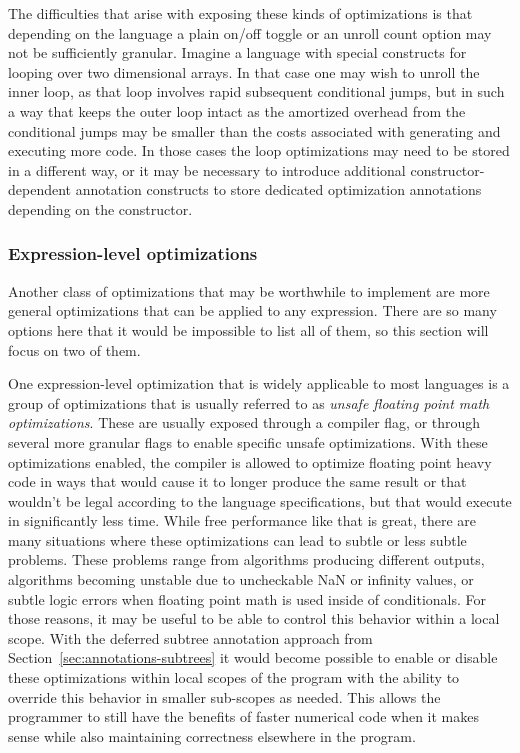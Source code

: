 \documentclass[fontsize=11pt,a4paper,parskip=half,numbers=noenddot]{scrartcl}
\begin{document}
The difficulties that arise with exposing these kinds of optimizations is that
depending on the language a plain on/off toggle or an unroll count option may
not be sufficiently granular. Imagine a language with special constructs for
looping over two dimensional arrays. In that case one may wish to unroll the
inner loop, as that loop involves rapid subsequent conditional jumps, but in
such a way that keeps the outer loop intact as the amortized overhead from the
conditional jumps may be smaller than the costs associated with generating and
executing more code. In those cases the loop optimizations may need to be stored
in a different way, or it may be necessary to introduce additional
constructor-dependent annotation constructs to store dedicated optimization
annotations depending on the constructor.

\subsubsection{Expression-level optimizations}


Another class of optimizations that may be worthwhile to implement are more
general optimizations that can be applied to any expression. There are so many
options here that it would be impossible to list all of them, so this section
will focus on two of them.

One expression-level optimization that is widely applicable to most languages is
a group of optimizations that is usually referred to as \emph{unsafe floating
  point math optimizations}. These are usually exposed through a
 compiler flag, or through several more granular flags to
enable specific unsafe optimizations. With these optimizations enabled, the
compiler is allowed to optimize floating point heavy code in ways that would
cause it to longer produce the same result or that wouldn't be legal according
to the language specifications, but that would execute in significantly less
time. While free performance like that is great, there are many situations where
these optimizations can lead to subtle or less subtle problems. These problems
range from algorithms producing different outputs, algorithms becoming unstable
due to uncheckable NaN or infinity values, or subtle logic errors when floating
point math is used inside of conditionals. For those reasons, it may be useful
to be able to control this behavior within a local scope. With the deferred
subtree annotation approach from Section~\ref{sec:annotations-subtrees} it would
become possible to enable or disable these optimizations within local scopes of
the program with the ability to override this behavior in smaller sub-scopes as
needed. This allows the programmer to still have the benefits of faster
numerical code when it makes sense while also maintaining correctness elsewhere
in the program.
\end{document}
